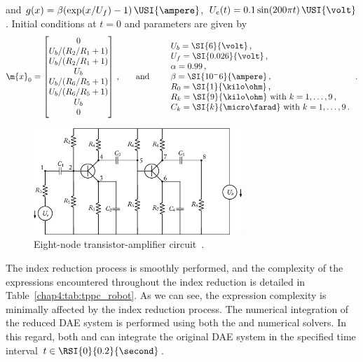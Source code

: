 %
and $g(x) = \beta(\exp(x/U_f) - 1)\,\USI{\ampere}$, $U_e(t) = 0.1\sin(200 \pi t)\,\USI{\volt}$. Initial conditions at $t = 0$ and parameters are given by
%
\begin{equation*}
  \m{x}_0 = \begin{bmatrix}
    0 \\
    U_b/(R_2/R_1 + 1) \\
    U_b/(R_2/R_1 + 1) \\
    U_b \\
    U_b/(R_6/R_5 + 1) \\
    U_b/(R_6/R_5 + 1) \\
    U_b \\
    0 \\
  \end{bmatrix} \, \text{,}
  \qquad \text{and} \qquad
  \begin{array}{l}
    U_b = \SI{6}{\volt} \, \text{,} \\
    U_f = \SI{0.026}{\volt} \, \text{,} \\
    \alpha = 0.99 \, \text{,} \\
    \beta = \SI{10^-6}{\ampere} \, \text{,} \\
    R_0 = \SI{1}{\kilo\ohm} \, \text{,} \\
    R_k = \SI{9}{\kilo\ohm} ~ \text{with} ~ k=1, \dots, 9 \, \text{,} \\
    C_k = \SI{k}{\micro\farad} ~ \text{with} ~ k=1, \dots, 9 \, \text{.} \\
  \end{array} \, \text{.}
\end{equation*}

\begin{figure}
  \centering
  \includegraphics[width=0.7\textwidth]{figures/chapter_4/transistor_amplifier.eps}
  \caption{Eight-node transistor-amplifier circuit~\cite{lioen1998test, mazzia2008test}.}
  \label{chap4:fig:transistor_amplifier}
\end{figure}

The index reduction process is smoothly performed, and the complexity of the expressions encountered throughout the index reduction is detailed in Table~\ref{chap4:tab:tppc_robot}. As we can see, the expression complexity is minimally affected by the index reduction process. The numerical integration of the reduced \ac{DAE} system is performed using both the \Maple{} and \Indigo{} numerical solvers. In this regard, both \Maple{} and \Indigo{} can integrate the original \ac{DAE} system in the specified time interval $t \in \RSI{0}{0.2}{\second}$.

